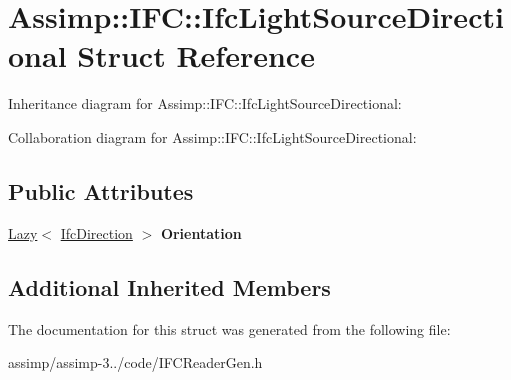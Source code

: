 \hypertarget{struct_assimp_1_1_i_f_c_1_1_ifc_light_source_directional}{\section{Assimp\+:\+:I\+F\+C\+:\+:Ifc\+Light\+Source\+Directional Struct Reference}
\label{struct_assimp_1_1_i_f_c_1_1_ifc_light_source_directional}
}


Inheritance diagram for Assimp\+:\+:I\+F\+C\+:\+:Ifc\+Light\+Source\+Directional\+:


Collaboration diagram for Assimp\+:\+:I\+F\+C\+:\+:Ifc\+Light\+Source\+Directional\+:
\subsection*{Public Attributes}
\begin{DoxyCompactItemize}
\item 
\hypertarget{struct_assimp_1_1_i_f_c_1_1_ifc_light_source_directional_ac2a626c43f144713bead8b2b4659359a}{\hyperlink{struct_assimp_1_1_s_t_e_p_1_1_lazy}{Lazy}$<$ \hyperlink{struct_assimp_1_1_i_f_c_1_1_ifc_direction}{Ifc\+Direction} $>$ {\bfseries Orientation}}\label{struct_assimp_1_1_i_f_c_1_1_ifc_light_source_directional_ac2a626c43f144713bead8b2b4659359a}

\end{DoxyCompactItemize}
\subsection*{Additional Inherited Members}


The documentation for this struct was generated from the following file\+:\begin{DoxyCompactItemize}
\item 
assimp/assimp-\/3../code/I\+F\+C\+Reader\+Gen.\+h\end{DoxyCompactItemize}
